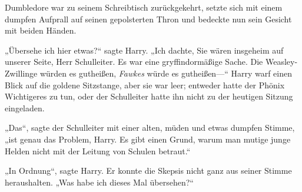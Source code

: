 Dumbledore war zu seinem Schreibtisch zurückgekehrt, setzte sich mit einem dumpfen Aufprall auf seinen gepolsterten Thron und bedeckte nun sein Gesicht mit beiden Händen.

„Übersehe ich hier etwas?“ sagte Harry. „Ich dachte, Sie wären insgeheim auf unserer Seite, Herr Schulleiter. Es war eine gryffindormäßige Sache. Die Weasley-Zwillinge würden es gutheißen, \emph{Fawkes} würde es gutheißen—“ Harry warf einen Blick auf die goldene Sitzstange, aber sie war leer; entweder hatte der Phönix Wichtigeres zu tun, oder der Schulleiter hatte ihn nicht zu der heutigen Sitzung eingeladen.

„Das“, sagte der Schulleiter mit einer alten, müden und etwas dumpfen Stimme, „ist genau das Problem, Harry. Es gibt einen Grund, warum man mutige junge Helden nicht mit der Leitung von Schulen betraut.“

„In Ordnung“, sagte Harry. Er konnte die Skepsis nicht ganz aus seiner Stimme heraushalten. „Was habe ich dieses Mal übersehen?“

